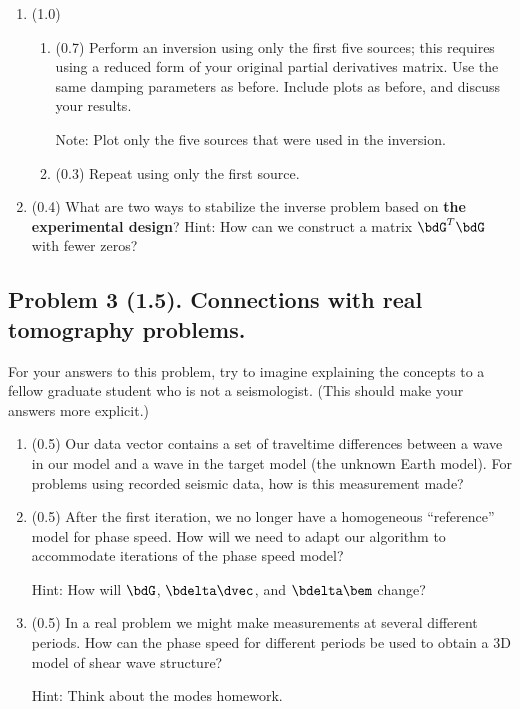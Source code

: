 \documentclass[11pt,titlepage,fleqn]{article}
\begin{document}
\begin{enumerate}
\begin{itemize}
\item The simplest way to plot $\bc_{\lambda}$ is probably with the \verb+plt.scatter()+ command. \\ But using something like \verb+plt.pcolormesh()+ will produce prettier results.

\end{itemize}

\item (1.0) \ptag\
%
\begin{enumerate}
\item (0.7) Perform an inversion using only the first five sources; this requires using a reduced form of your original partial derivatives matrix. Use the same damping parameters as before. Include plots as before, and discuss your results.

Note: Plot only the five sources that were used in the inversion.

\item (0.3) Repeat using only the first source.
\end{enumerate}

\item (0.4) What are two ways to stabilize the inverse problem based on {\bf the experimental design}? Hint: How can we construct a matrix $\bdG^T\bdG$ with fewer zeros?

\end{enumerate}


\pagebreak
\subsection*{Problem 3 (1.5). Connections with real tomography problems.}

For your answers to this problem, try to imagine explaining the concepts to a fellow graduate student who is not a seismologist. (This should make your answers more explicit.)

\begin{enumerate}
\item (0.5) Our data vector contains a set of traveltime differences between a wave in our model and a wave in the target model (\ie the unknown Earth model). For problems using recorded seismic data, how is this measurement made?

\item (0.5) After the first iteration, we no longer have a homogeneous ``reference'' model for phase speed. How will we need to adapt our algorithm to accommodate iterations of the phase speed model?

Hint: How will $\bdG$, $\bdelta\dvec$, and $\bdelta\bem$ change?

\item (0.5) In a real problem we might make measurements at several different periods. How can the phase speed for different periods be used to obtain a 3D model of shear wave structure?

Hint: Think about the modes homework.

\end{enumerate}
\end{document}
